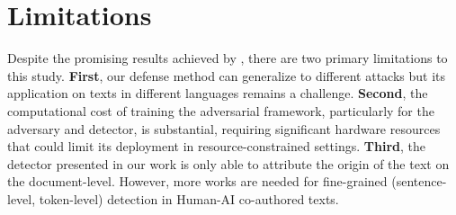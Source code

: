 \section*{Limitations}

Despite the promising results achieved by \modelname, there are two primary limitations to this study. 
\textbf{First}, our defense method can generalize to different attacks but its application on texts in different languages remains a challenge. 
\textbf{Second}, the computational cost of training the adversarial framework, particularly for the adversary and detector, is substantial, requiring significant hardware resources that could limit its deployment in resource-constrained settings.
\textbf{Third}, the detector presented in our work is only able to attribute the origin of the text on the document-level.
However, more works are needed for fine-grained (\eg sentence-level, token-level) detection in Human-AI co-authored texts.

